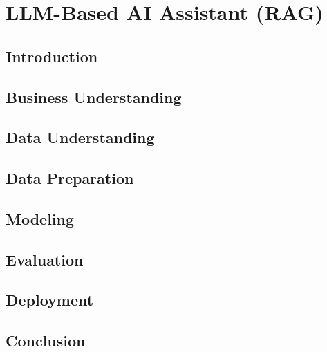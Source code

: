 \documentclass[12pt]{report}
\begin{document}
\chapter{LLM-Based AI Assistant (RAG)} %
\label{chap:llm-rag}

\section*{Introduction}

\pagebreak  %



\section{Business Understanding} %

\section{Data Understanding} %

\section{Data Preparation} %

\section{Modeling} %

\section{Evaluation} %

\section{Deployment} %


\section*{Conclusion}

\end{document}
